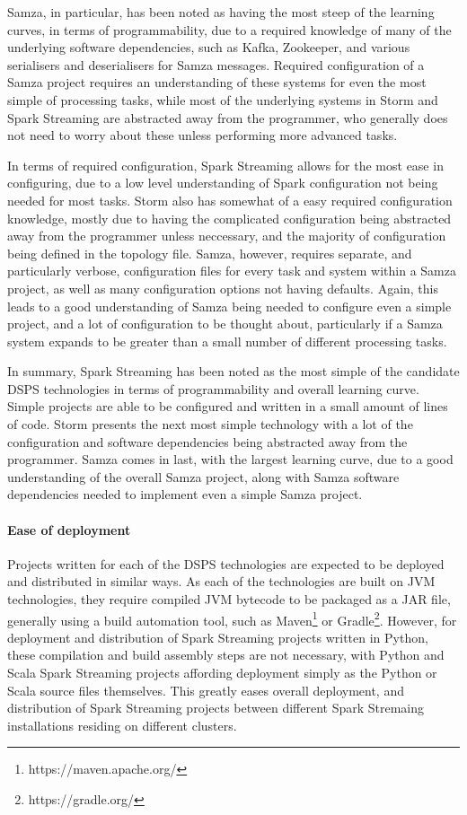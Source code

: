 Samza, in particular, has been noted as having the most steep of the learning curves, in terms of programmability, due
to a required knowledge of many of the underlying software dependencies, such as Kafka, Zookeeper, and various serialisers
and deserialisers for Samza messages. Required configuration of a Samza project requires an understanding of these systems for
even the most simple of processing tasks, while most of the underlying systems in Storm and Spark Streaming are abstracted
away from the programmer, who generally does not need to worry about these unless performing more advanced tasks.

In terms of required configuration, Spark Streaming allows for the most ease in configuring, due to a low level understanding
of Spark configuration not being needed for most tasks. Storm also has somewhat of a easy required configuration knowledge,
mostly due to having the complicated configuration being abstracted away from the programmer unless neccessary, and the
majority of configuration being defined in the topology file. Samza, however, requires separate, and particularly verbose,
configuration files for every task and system within a Samza project, as well as many configuration options not having
defaults. Again, this leads to a good understanding of Samza being needed to configure even a simple project, and a lot
of configuration to be thought about, particularly if a Samza system expands to be greater than a small number of different
processing tasks.

In summary, Spark Streaming has been noted as the most simple of the candidate DSPS technologies in terms of programmability
and overall learning curve. Simple projects are able to be configured and written in a small amount of lines of code.
Storm presents the next most simple technology with a lot of the configuration and software dependencies being abstracted
away from the programmer. Samza comes in last, with the largest learning curve, due to a good understanding of the overall
Samza project, along with Samza software dependencies needed to implement even a simple Samza project.


\paragraph{Ease of deployment}

Projects written for each of the DSPS technologies are expected to be deployed and distributed in similar ways. As each
of the technologies are built on JVM technologies, they require compiled JVM bytecode to be packaged as a JAR file, generally
using a build automation tool, such as Maven\footnote{https://maven.apache.org/} or Gradle\footnote{https://gradle.org/}.
However, for deployment and distribution of Spark Streaming projects written in Python, these compilation and build
assembly steps are not necessary, with Python and Scala Spark Streaming projects affording deployment simply as the Python
or Scala source files themselves. This greatly eases overall deployment, and distribution of Spark Streaming projects between
different Spark Stremaing installations residing on different clusters.

